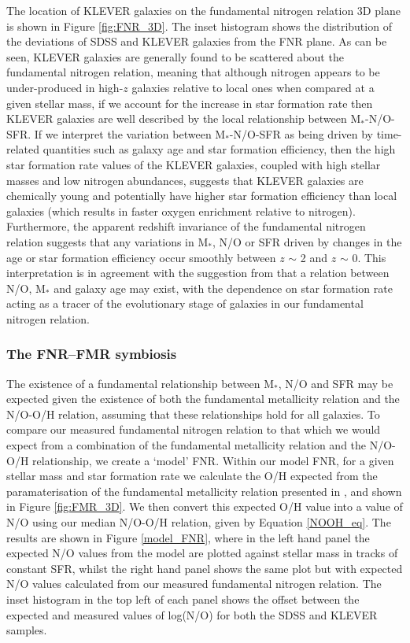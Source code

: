 \documentclass[usenatbib]{mnras} %
\begin{document}
 The location of KLEVER galaxies on the fundamental nitrogen relation 3D plane is shown in Figure \ref{fig:FNR_3D}. The inset histogram shows the distribution of the deviations of SDSS and KLEVER galaxies from the FNR plane. As can be seen, KLEVER galaxies are generally found to be scattered about the fundamental nitrogen relation, meaning that although nitrogen appears to be under-produced in high-$z$ galaxies relative to local ones when compared at a given stellar mass, if we account for the increase in star formation rate then KLEVER galaxies are well described by the local relationship between M$_*$-N/O-SFR. If we interpret the variation between M$_*$-N/O-SFR as being driven by time-related quantities such as galaxy age and star formation efficiency, then the high star formation rate values of the KLEVER galaxies, coupled with high stellar masses and low nitrogen abundances, suggests that KLEVER galaxies are chemically young and potentially have higher star formation efficiency than local galaxies (which results in faster oxygen enrichment relative to nitrogen). Furthermore, the apparent redshift invariance of the fundamental nitrogen relation suggests that any variations in M$_*$, N/O or SFR driven by changes in the age or star formation efficiency occur smoothly between $z$ $\sim$ 2 and $z$ $\sim$ 0. This interpretation is in agreement with the suggestion from \cite{Masters_2016} that a relation between N/O, M$_*$ and galaxy age may exist, with the dependence on star formation rate acting as a tracer of the evolutionary stage of galaxies in our fundamental nitrogen relation.




\subsubsection{The FNR--FMR symbiosis}

The existence of a fundamental relationship between M$_*$, N/O and SFR may be expected given the existence of both the fundamental metallicity relation and the N/O-O/H relation, assuming that these relationships hold for all galaxies. To compare our measured fundamental nitrogen relation to that which we would expect from a combination of the fundamental metallicity relation and the N/O-O/H relationship, we create a `model' FNR. Within our model FNR, for a given stellar mass and star formation rate we calculate the O/H expected from the paramaterisation of the fundamental metallicity relation presented in \cite{Curti_2020FMR}, and shown in Figure \ref{fig:FMR_3D}. We then convert this expected O/H value into a value of N/O using our median N/O-O/H relation, given by Equation \ref{NOOH_eq}. The results are shown in Figure \ref{model_FNR}, where in the left hand panel the expected N/O values from the model are plotted against stellar mass in tracks of constant SFR, whilst the right hand panel shows the same plot but with expected N/O values calculated from our measured fundamental nitrogen relation. The inset histogram in the top left of each panel shows the offset between the expected and measured values of log(N/O) for both the SDSS and KLEVER samples. 
\end{document}
